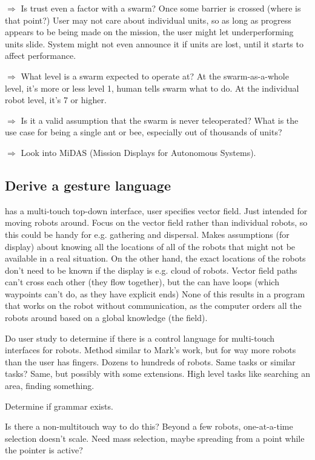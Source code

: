 \documentclass[]{article}
\begin{document}
$\Rightarrow$ Is trust even a factor with a swarm? Once some barrier is crossed (where is that point?) User may not care about individual units, so as long as progress appears to be being made on the mission, the user might let underperforming units slide. System might not even announce it if units are lost, until it starts to affect performance.  

$\Rightarrow$ What level is a swarm expected to operate at? At the swarm-as-a-whole level, it's more or less level 1, human tells swarm what to do. At the individual robot level, it's 7 or higher. 

$\Rightarrow$ Is it a valid assumption that the swarm is never teleoperated? What is the use case for being a single ant or bee, especially out of thousands of units?

$\Rightarrow$ Look into MiDAS (Mission Displays for Autonomous Systems). 

\subsection{Derive a gesture language}

\cite{Kato:2009:MIC:1520340.1520500} has a multi-touch top-down interface, user specifies vector field. Just intended for moving robots around. Focus on the vector field rather than individual robots, so this could be handy for e.g. gathering and dispersal. Makes assumptions (for display) about knowing all the locations of all of the robots that might not be available in a real situation. On the other hand, the exact locations of the robots don't need to be known if the display is e.g. cloud of robots. Vector field paths can't cross each other (they flow together), but the can have loops (which waypoints can't do, as they have explicit ends) None of this results in a program that works on the robot without communication, as the computer orders all the robots around based on a global knowledge (the field).


Do user study to determine if there is a control language for multi-touch interfaces for robots.
Method similar to Mark's work, but for way more robots than the user has fingers. 
Dozens to hundreds of robots. 
Same tasks or similar tasks? Same, but possibly with some extensions. 
High level tasks like searching an area, finding something. 

Determine if grammar exists. 

Is there a non-multitouch way to do this? Beyond a few robots, one-at-a-time selection doesn't scale. Need mass selection, maybe spreading from a point while the pointer is active?
\end{document}

